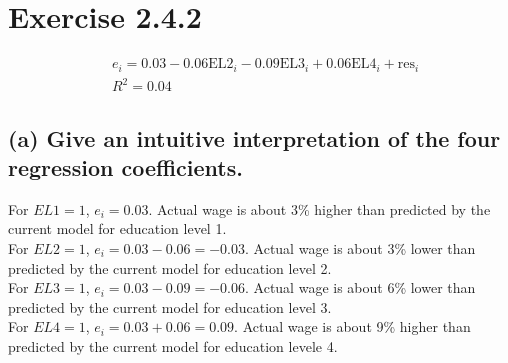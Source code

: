 \documentclass[12pt, a4paper]{article}
\begin{document}
\section*{Exercise 2.4.2}
\vspace{1em}

\begin{align*}
    &e_i = 0.03 - 0.06\text{EL2}_i -  0.09\text{EL3}_i +  0.06\text{EL4}_i + \text{res}_i\\
    &R^2 = 0.04
\end{align*}

\subsection*{(a) Give an intuitive interpretation of the four regression coefficients.}
For $EL1 = 1$, $e_i = 0.03$. Actual wage is about 3\% higher than predicted by the current model for education level 1.\\
For $EL2 = 1$, $e_i = 0.03 - 0.06 = -0.03$. Actual wage is about 3\% lower than predicted by the current model for education level 2.\\
For $EL3 = 1$, $e_i = 0.03 - 0.09 = -0.06$. Actual wage is about 6\% lower than predicted by the current model for education level 3.\\
For $EL4 = 1$, $e_i = 0.03 + 0.06 = 0.09$. Actual wage is about 9\% higher than predicted by the current model for education levele 4.\\
\vspace{1em}
\end{document}
